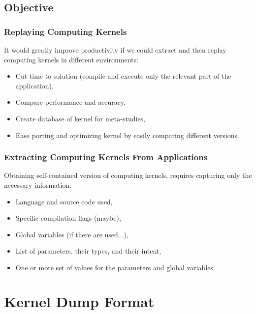\documentclass{beamer}
\begin{document}
\subsection{Objective}

\begin{frame}
  \frametitle{Replaying Computing Kernels}

  It would greatly improve productivity if we could extract and then replay
computing kernels in different environments:
  \begin{itemize}
    \item Cut time to solution (compile and execute only the relevant part of the application),
    \item Compare performance and accuracy,
    \item Create database of kernel for meta-studies,
    \item Ease porting and optimizing kernel by easily comparing different versions.
  \end{itemize}
\end{frame}

\begin{frame}
  \frametitle{Extracting Computing Kernels From Applications}

  Obtaining self-contained version of computing kernels, requires
capturing only the necessary information:
  \begin{itemize}
    \item Language and source code used,
    \item Specific compilation flags (maybe),
    \item Global variables (if there are used...),
    \item List of parameters, their types, and their intent,
    \item One or more set of values for the parameters and global variables.
  \end{itemize}
\end{frame}

\section{Kernel Dump Format}
\end{document}

